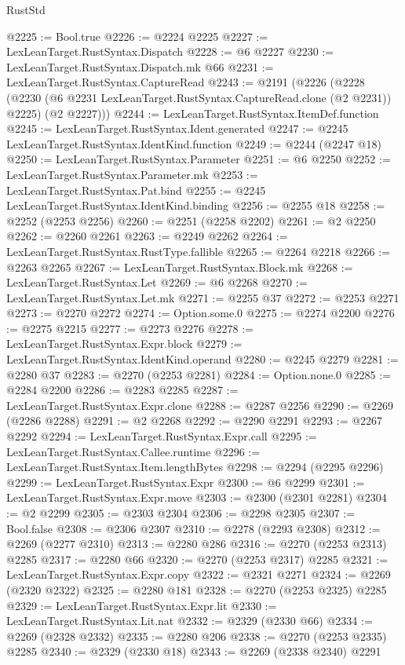 \begin{lexlean}{RustStd}
\begin{coremodule}
@2225 := Bool.true
@2226 := @2224 @2225
@2227 := LexLeanTarget.RustSyntax.Dispatch
@2228 := @6 @2227
@2230 := LexLeanTarget.RustSyntax.Dispatch.mk @66
@2231 := LexLeanTarget.RustSyntax.CaptureRead
@2243 := @2191
    (@2226
      (@2228
        (@2230 (@6 @2231 LexLeanTarget.RustSyntax.CaptureRead.clone (@2 @2231)) @2225)
        (@2 @2227)))
@2244 := LexLeanTarget.RustSyntax.ItemDef.function
@2245 := LexLeanTarget.RustSyntax.Ident.generated
@2247 := @2245 LexLeanTarget.RustSyntax.IdentKind.function
@2249 := @2244 (@2247 @18)
@2250 := LexLeanTarget.RustSyntax.Parameter
@2251 := @6 @2250
@2252 := LexLeanTarget.RustSyntax.Parameter.mk
@2253 := LexLeanTarget.RustSyntax.Pat.bind
@2255 := @2245 LexLeanTarget.RustSyntax.IdentKind.binding
@2256 := @2255 @18
@2258 := @2252 (@2253 @2256)
@2260 := @2251 (@2258 @2202)
@2261 := @2 @2250
@2262 := @2260 @2261
@2263 := @2249 @2262
@2264 := LexLeanTarget.RustSyntax.RustType.fallible
@2265 := @2264 @2218
@2266 := @2263 @2265
@2267 := LexLeanTarget.RustSyntax.Block.mk
@2268 := LexLeanTarget.RustSyntax.Let
@2269 := @6 @2268
@2270 := LexLeanTarget.RustSyntax.Let.mk
@2271 := @2255 @37
@2272 := @2253 @2271
@2273 := @2270 @2272
@2274 := Option.some.{0}
@2275 := @2274 @2200
@2276 := @2275 @2215
@2277 := @2273 @2276
@2278 := LexLeanTarget.RustSyntax.Expr.block
@2279 := LexLeanTarget.RustSyntax.IdentKind.operand
@2280 := @2245 @2279
@2281 := @2280 @37
@2283 := @2270 (@2253 @2281)
@2284 := Option.none.{0}
@2285 := @2284 @2200
@2286 := @2283 @2285
@2287 := LexLeanTarget.RustSyntax.Expr.clone
@2288 := @2287 @2256
@2290 := @2269 (@2286 @2288)
@2291 := @2 @2268
@2292 := @2290 @2291
@2293 := @2267 @2292
@2294 := LexLeanTarget.RustSyntax.Expr.call
@2295 := LexLeanTarget.RustSyntax.Callee.runtime
@2296 := LexLeanTarget.RustSyntax.Item.lengthBytes
@2298 := @2294 (@2295 @2296)
@2299 := LexLeanTarget.RustSyntax.Expr
@2300 := @6 @2299
@2301 := LexLeanTarget.RustSyntax.Expr.move
@2303 := @2300 (@2301 @2281)
@2304 := @2 @2299
@2305 := @2303 @2304
@2306 := @2298 @2305
@2307 := Bool.false
@2308 := @2306 @2307
@2310 := @2278 (@2293 @2308)
@2312 := @2269 (@2277 @2310)
@2313 := @2280 @286
@2316 := @2270 (@2253 @2313) @2285
@2317 := @2280 @66
@2320 := @2270 (@2253 @2317) @2285
@2321 := LexLeanTarget.RustSyntax.Expr.copy
@2322 := @2321 @2271
@2324 := @2269 (@2320 @2322)
@2325 := @2280 @181
@2328 := @2270 (@2253 @2325) @2285
@2329 := LexLeanTarget.RustSyntax.Expr.lit
@2330 := LexLeanTarget.RustSyntax.Lit.nat
@2332 := @2329 (@2330 @66)
@2334 := @2269 (@2328 @2332)
@2335 := @2280 @206
@2338 := @2270 (@2253 @2335) @2285
@2340 := @2329 (@2330 @18)
@2343 := @2269 (@2338 @2340) @2291

\end{coremodule}
\end{lexlean}
